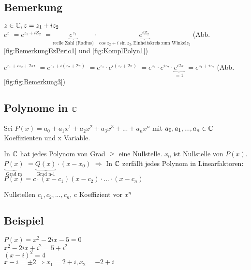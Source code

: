 \renewcommand{\ldate}{2015-11-26}

\subsection{Bemerkung}
$z \in \mathbb{C}, z=z_1 + i z_2$\\
$e^z $
$= e^{z_1+i Z_2} $
$= \underbrace{e^{z_1}}_{\textrm{reelle Zahl (Radius)}} \cdot \underbrace{e^{i Z_2}}_{\cos z_2 + i\sin z_2, \textrm{Einheitskreis zum Winkel} z_2}$ (Abb. \ref{fig:BemerkungEzPerio1} und \ref{fig:KomplPolyn1})

\underline{$e^{z_1 + i z_2 + 2 \pi i}$}
$= e^{z_1 + i (z_2 + 2 \pi)}$
$= e^{z_1} \cdot e^{i (z_2 + 2 \pi)}$
$=e^{z_1} \cdot e^{i z_2} \cdot \underbrace{e^{i2\pi}}_{=1}$
\underline{$=e^{z_1 + i z_2}$} (Abb. \ref{fig:fig:Bemerkung3})

\subsection{Polynome in $\mathbb{C}$}
Sei $P(x) = a_0 + a_1 x^1 +  a_2 x^2 +  a_3 x^3 + ... +  a_n x^n$ mit $a_0, a_1, ..., a_n \in \mathbb{C}$ Koeffizienten und x Variable.

In $\mathbb{C}$ hat jedes Polynom von Grad $\geq$ eine Nullstelle.  $x_0$ ist Nullstelle von $P(x)$. 
$\underbrace{P(x)}_{\textrm{Grad m}}$
$=\underbrace{Q(x)}_{\textrm{Grad n-1}} \cdot (x - x_0)$
$\Rightarrow$ In $\mathbb{C}$ zerfällt jedes Polynom in Linearfaktoren: 
$P(x) = c\cdot (x-c_1)(x-c_2)\cdot ... \cdot (x-c_n)$

Nullstellen $c_1, c_2, ..., c_n$, c Koeffizient vor $x^n$

\subsection{Beispiel}
$P(x) = x^2 - 2ix - 5 = 0$\\
$x^2 - 2ix + i^2 = 5 + i^2$\\
$(x-i)^2 = 4$\\
$x-i = \pm 2 \Rightarrow x_1 = 2+i, x_2 = -2 + i$

